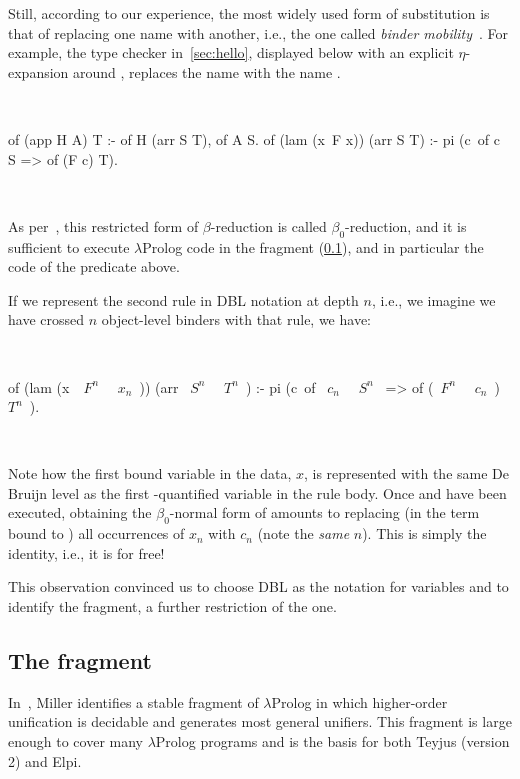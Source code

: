 \documentclass[a4paper, 11pt]{book}
\newenvironment{elpicode}
  {\VerbatimEnvironment~\\\begin{elpibox}\begin{xelpicode}}{\end{xelpicode}
\end{elpibox}\\}
\begin{document}
Still, according to our experience, the most widely used form of substitution
is that of replacing one name with another, i.e., the one called
\emph{binder mobility}~\cite{Miller2018MechanizedMR}. For example, the type
checker in~\cref{sec:hello}, displayed below with an explicit
$\eta$-expansion around , replaces the name  with the name
.

\begin{elpicode}
of (app H A) T :- of H (arr S T), of A S.
of (lam (x\ F x)) (arr S T) :- pi (c\ of c S => of (F c) T).
\end{elpicode}

\noindent
As per~\cite{10.1093/logcom/1.4.497}, this restricted form of $\beta$-reduction
is called $\beta_0$-reduction, and it is sufficient to execute $\lambda$Prolog
code in the \theotherfragment fragment (\cref{sec:llam}), and in particular the code of
the  predicate above.


If we represent the second rule in DBL notation at depth $n$, i.e., we imagine
we have crossed $n$ object-level binders with that rule, we have:

\begin{elpicode}
of (lam (x\ ~$F^n$~ ~$x_n$~)) (arr ~$S^n$~ ~$T^n$~) :-
  pi (c\ of ~$c_n$~ ~$S^n$~ => of (~$F^n$~ ~$c_n$~) ~$T^n$~).
\end{elpicode}

\noindent
Note how the first bound variable in the data, $x$, is represented with the
same De Bruijn level as the first -quantified variable in the rule
body. Once  and \elpi{=>} have been executed, obtaining the
$\beta_0$-normal form of  amounts to replacing (in the term
bound to ) all occurrences of $x_n$ with $c_n$ (note the \emph{same}
$n$). This is simply the identity, i.e., it is for free!


This observation convinced us to choose DBL as the notation for variables and
to identify the \thefragment fragment, a further restriction of the \theotherfragment one.

\subsection{The \theotherfragment fragment}\label{sec:llam}


In~\cite{10.1093/logcom/1.4.497}, Miller identifies a stable fragment of
$\lambda$Prolog in which higher-order unification is decidable and generates
most general unifiers. This fragment is large enough to cover many
$\lambda$Prolog programs and is the basis for both Teyjus (version 2) and
Elpi.
\end{document}
